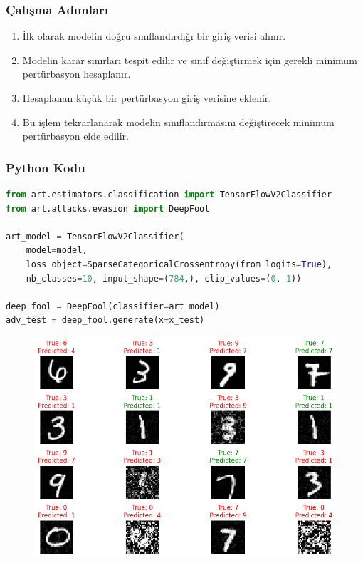 \subsubsection{Çalışma Adımları}

\begin{enumerate}
    \item İlk olarak modelin doğru sınıflandırdığı bir giriş verisi alınır.
    \item Modelin karar sınırları tespit edilir ve sınıf değiştirmek için gerekli minimum pertürbasyon hesaplanır.
    \item Hesaplanan küçük bir pertürbasyon giriş verisine eklenir.
    \item Bu işlem tekrarlanarak modelin sınıflandırmasını değiştirecek minimum pertürbasyon elde edilir.
\end{enumerate}

\subsubsection{Python Kodu}

\begin{lstlisting}[language=Python]
from art.estimators.classification import TensorFlowV2Classifier
from art.attacks.evasion import DeepFool

art_model = TensorFlowV2Classifier(
    model=model, 
    loss_object=SparseCategoricalCrossentropy(from_logits=True), 
    nb_classes=10, input_shape=(784,), clip_values=(0, 1))

deep_fool = DeepFool(classifier=art_model)
adv_test = deep_fool.generate(x=x_test)
\end{lstlisting}

\newpage

\begin{figure}[h]
    \centering
    \includegraphics[width=1\textwidth]{images/deep_fool_attack_results.png}
    \caption{}
\end{figure}

